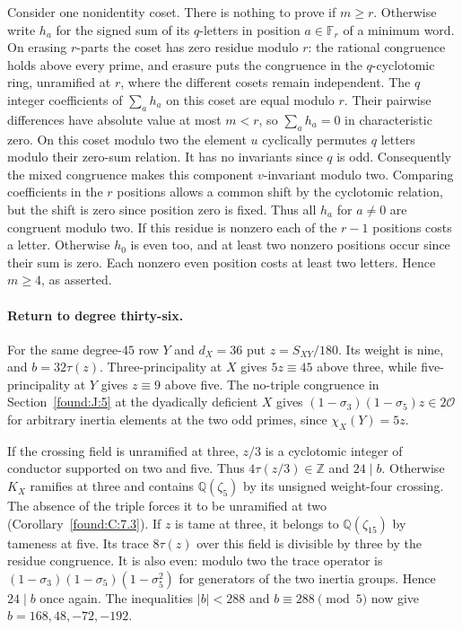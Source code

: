 \documentclass[11pt,a4paper]{article}
\numberwithin{equation}{section}
\theoremstyle{remark}
\begin{document}
Consider one nonidentity coset. There is nothing to prove if $m\ge r$. Otherwise write $h_a$ for the signed sum of its $q$-letters in position $a\in\mathbb F_r$ of a minimum word. On erasing $r$-parts the coset has zero residue modulo $r$: the rational congruence holds above every prime, and erasure puts the congruence in the $q$-cyclotomic ring, unramified at $r$, where the different cosets remain independent. The $q$ integer coefficients of $\sum_a h_a$ on this coset are equal modulo $r$. Their pairwise differences have absolute value at most $m<r$, so $\sum_a h_a=0$ in characteristic zero. On this coset modulo two the element $u$ cyclically permutes $q$ letters modulo their zero-sum relation. It has no invariants since $q$ is odd. Consequently the mixed congruence makes this component $v$-invariant modulo two. Comparing coefficients in the $r$ positions allows a common shift by the cyclotomic relation, but the shift is zero since position zero is fixed. Thus all $h_a$ for $a\ne0$ are congruent modulo two. If this residue is nonzero each of the $r-1$ positions costs a letter. Otherwise $h_0$ is even too, and at least two nonzero positions occur since their sum is zero. Each nonzero even position costs at least two letters. Hence $m\ge4$, as asserted.

\paragraph{Return to degree thirty-six.}
For the same degree-$45$ row $Y$ and $d_X=36$ put $z=S_{XY}/180$. Its weight is nine, and $b=32\tau(z)$. Three-principality at $X$ gives $5z\equiv45$ above three, while five-principality at $Y$ gives $z\equiv9$ above five. The no-triple congruence in Section~\ref{found:J:5} at the dyadically deficient $X$ gives $(1-\sigma_3)(1-\sigma_5)z\in2\mathcal O$ for arbitrary inertia elements at the two odd primes, since $\chi_X(Y)=5z$.

If the crossing field is unramified at three, $z/3$ is a cyclotomic integer of conductor supported on two and five. Thus $4\tau(z/3)\in\mathbb Z$ and $24\mid b$. Otherwise $K_X$ ramifies at three and contains $\mathbb Q(\zeta_5)$ by its unsigned weight-four crossing. The absence of the triple forces it to be unramified at two (Corollary~\ref{found:C:7.3}). If $z$ is tame at three, it belongs to $\mathbb Q(\zeta_{15})$ by tameness at five. Its trace $8\tau(z)$ over this field is divisible by three by the residue congruence. It is also even: modulo two the trace operator is $(1-\sigma_3)(1-\sigma_5)(1-\sigma_5^2)$ for generators of the two inertia groups. Hence $24\mid b$ once again. The inequalities $|b|<288$ and $b\equiv288\pmod5$ now give $b=168,48,-72,-192$.
\end{document}
